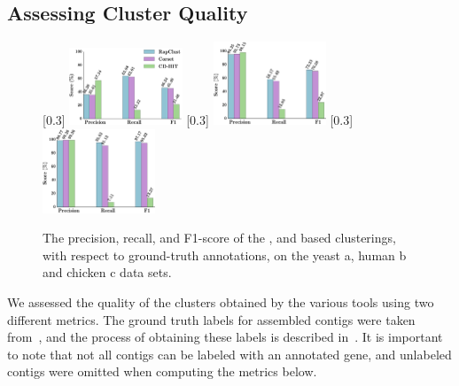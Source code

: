 \subsection{Assessing Cluster Quality}
\label{subsec:quality}
\begin{figure}[htb]
    \centering
    [0.3\textwidth]{
        \includegraphics[width=0.3\textwidth]{Figures/concordance_yeast_legend}}
    [0.3\textwidth]{
        \includegraphics[width=0.3\textwidth]{Figures/concordance_human}}
    [0.3\textwidth]{
        \includegraphics[width=0.3\textwidth]{Figures/concordance_chicken}}
    \caption{The precision, recall, and F1-score of the \rapclust, \corset and \cdhit based clusterings, with respect to ground-truth annotations, on the yeast a, human b and chicken c data sets.\label{fig:cluster_quality}}
\end{figure}

We assessed the quality of the clusters obtained by the various tools using two different metrics. The ground truth labels for \denovo assembled contigs were taken from~\citep{corset_data}, and the process of obtaining these labels is described in~\citep{corset}.  It is important to note that not all contigs can be labeled with an annotated gene, and unlabeled contigs were omitted when computing the metrics below.


